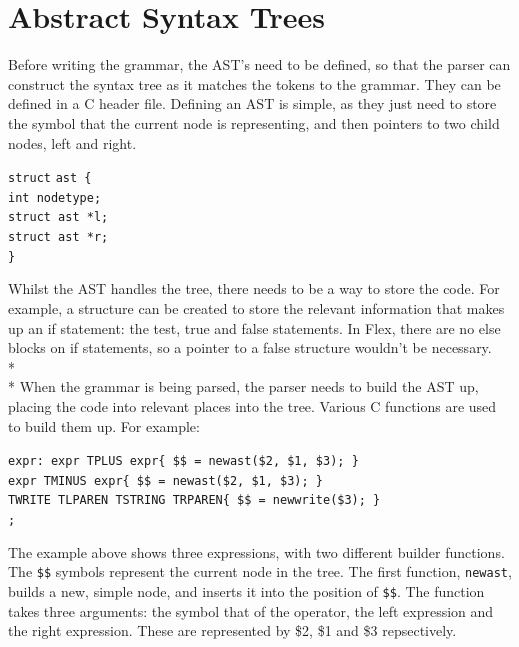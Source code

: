 \documentclass[12pt]{report}
\begin{document}
\section{Abstract Syntax Trees}
Before writing the grammar, the AST's need to be defined, so that the parser can construct the syntax tree as it matches the tokens to the grammar.  They can be defined in a C header file.  Defining an AST is simple, as they just need to store the symbol that the current node is representing, and then pointers to two child nodes, left and right.\\
\begin{tabbing}
	\texttt{struct} \= \texttt{ast \{}\\
	\> \texttt{int nodetype;}\\
	\> \texttt{struct ast *l;}\\
	\> \texttt{struct ast *r;}\\
	\texttt{\}}
\end{tabbing}
Whilst the AST handles the tree, there needs to be a way to store the code.  For example, a structure can be created to store the relevant information that makes up an if statement: the test, true and false statements.  In Flex, there are no else blocks on if statements, so a pointer to a false structure wouldn't be necessary.\\*
\\*
When the grammar is being parsed, the parser needs to build the AST up, placing the code into relevant places into the tree.  Various C functions are used to build them up.  For example:\\
\begin{tabbing}
	\texttt{expr}\=\texttt{: expr TPLUS expr\quad\quad\quad\quad\quad\quad\{ \$\$ = newast(\$2, \$1, \$3); \}}\\
	\> \texttt{\textbar \space expr TMINUS expr\quad\quad\quad\quad\quad\quad\{ \$\$ = newast(\$2, \$1, \$3); \}}\\
	\> \texttt{\textbar \space TWRITE TLPAREN TSTRING TRPAREN\quad\{ \$\$ = newwrite(\$3); \}}\\
	\> \texttt{;}
\end{tabbing}
The example above shows three expressions, with two different builder functions.  The \texttt{\$\$} symbols represent the current node in the tree.  The first function, \texttt{newast}, builds a new, simple node, and inserts it into the position of \texttt{\$\$}.  The function takes three arguments: the symbol that of the operator, the left expression and the right expression.  These are represented by \$2, \$1 and \$3 repsectively.
\end{document}

